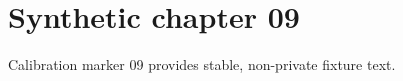 \chapter{Synthetic chapter 09}\label{chap:09}
Calibration marker 09 provides stable, non-private fixture text.
